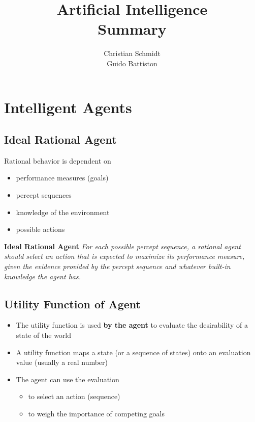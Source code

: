 \documentclass[conference]{styles/acmsiggraph}
\title{\huge Artificial Intelligence \\ \LARGE {Summary}}
\author{\Large Christian Schmidt \\ \Large Guido Battiston}
\begin{document}
\maketitle

\tableofcontents
\newpage

\section{Intelligent Agents}

    \subsection{Ideal Rational Agent}
        Rational behavior is dependent on
        \begin{itemize}
            \item performance measures (goals)
            \item percept sequences
            \item knowledge of the environment
            \item possible actions
        \end{itemize}
        
        \textbf{Ideal Rational Agent}
        \textit{
            For each possible percept sequence, a rational agent should select an action that is expected to maximize its performance measure, given the evidence provided by the percept sequence and whatever built-in knowledge the agent has.
        }
        
        
    \subsection{Utility Function of Agent}
        \begin{itemize}
            \item The utility function is used \textbf{by the agent} to evaluate the desirability of a state of the world
            \item A utility function maps a state (or a sequence of states) onto an evaluation value (usually a real number)
            \item The agent can use the evaluation
                \begin{itemize}
                    \item to select an action (sequence)
                    \item to weigh the importance of competing goals
                \end{itemize}
        \end{itemize}
\end{document}
